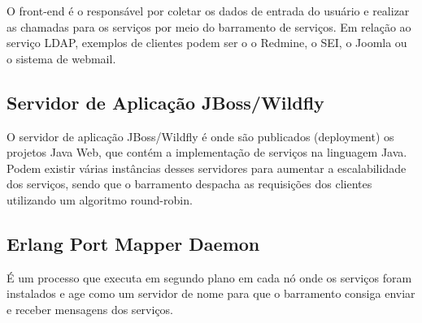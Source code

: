 O front-end é o responsável por coletar os dados de entrada do usuário
e realizar as chamadas para os serviços por meio do barramento de serviços.
Em relação ao serviço LDAP, exemplos de clientes podem ser o 
o Redmine, o SEI, o Joomla ou o sistema de webmail.


\subsection{Servidor de Aplicação JBoss/Wildfly}

O servidor de aplicação JBoss/Wildfly é onde são publicados (deployment)
os projetos Java Web, que contém a implementação de serviços na linguagem Java. 
Podem existir várias instâncias desses servidores para
aumentar a escalabilidade dos serviços, sendo que o barramento despacha
as requisições dos clientes utilizando um algoritmo round-robin.

\subsection{Erlang Port Mapper Daemon}

É um processo que executa em 
segundo plano em cada nó onde os serviços foram instalados e age 
como um servidor de nome para que o barramento consiga
enviar e receber mensagens dos serviços.

